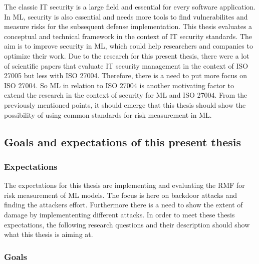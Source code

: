 The classic IT security is a large field and essential for every software application. In ML, security is also essential and needs more tools to find vulnerabilites and measure risks for the subsequent
defense implementation. This thesis evaluates a conceptual and technical framework in the context of IT security standards. The aim is to improve security in ML, which could help researchers and
companies to optimize their work. Due to the research for this present thesis, there were a lot of scientific papers that evaluate IT security management in the context of ISO 27005 but less with ISO
27004. Therefore, there is a need to put more focus on ISO 27004. So ML in relation to ISO 27004 is another motivating factor to extend the research in the context of security for ML and ISO 27004. From
the previously mentioned points, it should emerge that this thesis should show the possibility of using common standards for risk measurement in ML.

\subsection{Goals and expectations of this present thesis}


\subsubsection*{Expectations}

The expectations for this thesis are implementing and evaluating the RMF for risk measurement of ML models. The focus is here on backdoor attacks and finding the attackers effort. Furthermore there is a
need to show the extent of damage by implemententing different attacks. In order to meet these thesis expectations, the following research questions and their description should show what this thesis is
aiming at.

\subsubsection*{Goals}


